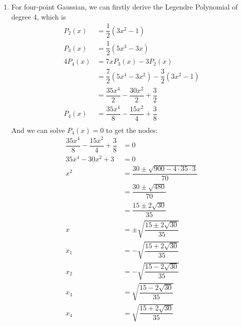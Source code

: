 \documentclass{article}
\begin{document}
\begin{enumerate}
  \item
  For four-point Gaussian, we can firstly derive the Legendre Polynomial of degree 4, which is \begin{align*}
  P_2(x) &=\dfrac{1}{2}(3x^2-1)\\
  P_3(x) &=\dfrac{1}{2}(5x^3-3x)\\
  4P_4(x) &= 7xP_3(x)-3P_2(x)\\
  &=\dfrac{7}{2}(5x^4-3x^2)-\dfrac{3}{2}(3x^2-1)\\
  &=\dfrac{35x^4}{2}-\dfrac{30x^2}{2}+\dfrac{3}{2}\\
  P_4(x)&=\dfrac{35x^4}{8}-\dfrac{15x^2}{4}+\dfrac{3}{8}\\
\end{align*}
And we can solve $P_4(x) =0$  to get the nodes:\begin{align*}
\dfrac{35x^4}{8}-\dfrac{15x^2}{4}+\dfrac{3}{8}&=0\\
35x^4-30x^2+3&=0\\
x^2&=\dfrac{30\pm \sqrt{900-4\cdot 35\cdot 3}}{70}\\
&=\dfrac{30\pm \sqrt{480}}{70}\\
&=\dfrac{15\pm 2\sqrt{30}}{35}\\
x&=\pm \sqrt{\dfrac{15\pm 2\sqrt{30}}{35}}\\
x_1 &= -\sqrt{\dfrac{15+ 2\sqrt{30}}{35}}\\
x_2&=-\sqrt{\dfrac{15- 2\sqrt{30}}{35}}\\
x_3 &= \sqrt{\dfrac{15- 2\sqrt{30}}{35}}\\
x_4&=\sqrt{\dfrac{15+ 2\sqrt{30}}{35}}
\end{align*}


\end{enumerate}
\end{document}
